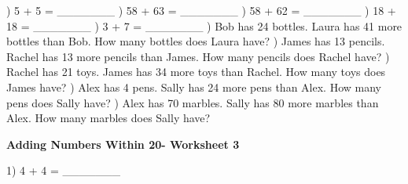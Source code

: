 \documentclass{article}%
\begin{document}
\newline%
) 5 + 5 = \_\_\_\_\_\_\_%
\newline%
\newline%
) 58 + 63 = \_\_\_\_\_\_\_%
\newline%
\newline%
) 58 + 62 = \_\_\_\_\_\_\_%
\newline%
\newline%
) 18 + 18 = \_\_\_\_\_\_\_%
\newline%
\newline%
) 3 + 7 = \_\_\_\_\_\_\_%
\newline%
\newline%
) Bob has 24 bottles. Laura has 41 more bottles than Bob. How many bottles does Laura have?%
\newline%
\newline%
) James has 13 pencils. Rachel has 13 more pencils than James. How many pencils does Rachel have?%
\newline%
\newline%
) Rachel has 21 toys. James has 34 more toys than Rachel. How many toys does James have?%
\newline%
\newline%
) Alex has 4 pens. Sally has 24 more pens than Alex. How many pens does Sally have?%
\newline%
\newline%
) Alex has 70 marbles. Sally has 80 more marbles than Alex. How many marbles does Sally have?%
\newline%
\newline%
\newline%
\pagebreak%
\large%
\begin{center}%
\textbf{Adding Numbers Within 20- Worksheet 3}%
\newline%
\newline%
\newline%
\end{center} \normalsize%
1) 4 + 4 = \_\_\_\_\_\_\_%
\newline%
\end{document}
